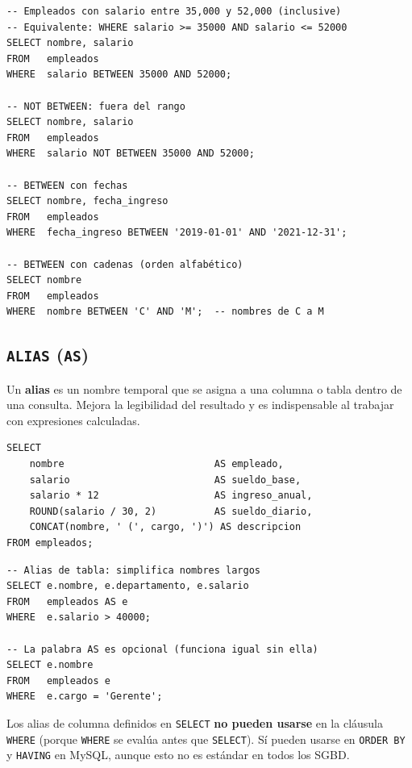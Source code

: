 \begin{lstlisting}[caption={BETWEEN con números y fechas.}]
-- Empleados con salario entre 35,000 y 52,000 (inclusive)
-- Equivalente: WHERE salario >= 35000 AND salario <= 52000
SELECT nombre, salario
FROM   empleados
WHERE  salario BETWEEN 35000 AND 52000;

-- NOT BETWEEN: fuera del rango
SELECT nombre, salario
FROM   empleados
WHERE  salario NOT BETWEEN 35000 AND 52000;

-- BETWEEN con fechas
SELECT nombre, fecha_ingreso
FROM   empleados
WHERE  fecha_ingreso BETWEEN '2019-01-01' AND '2021-12-31';

-- BETWEEN con cadenas (orden alfabético)
SELECT nombre
FROM   empleados
WHERE  nombre BETWEEN 'C' AND 'M';  -- nombres de C a M
\end{lstlisting}

\subsection{\texttt{ALIAS} (\texttt{AS})}

Un \textbf{alias} es un nombre temporal que se asigna a una columna
o tabla dentro de una consulta.
Mejora la legibilidad del resultado y es indispensable al trabajar
con expresiones calculadas.

\begin{lstlisting}[caption={Alias de columna con AS.}]
SELECT
    nombre                          AS empleado,
    salario                         AS sueldo_base,
    salario * 12                    AS ingreso_anual,
    ROUND(salario / 30, 2)          AS sueldo_diario,
    CONCAT(nombre, ' (', cargo, ')') AS descripcion
FROM empleados;
\end{lstlisting}

\begin{lstlisting}[caption={Alias de tabla: útil con JOINs y subconsultas.}]
-- Alias de tabla: simplifica nombres largos
SELECT e.nombre, e.departamento, e.salario
FROM   empleados AS e
WHERE  e.salario > 40000;

-- La palabra AS es opcional (funciona igual sin ella)
SELECT e.nombre
FROM   empleados e
WHERE  e.cargo = 'Gerente';
\end{lstlisting}

\begin{nota}
Los alias de columna definidos en \texttt{SELECT} \textbf{no pueden
usarse} en la cláusula \texttt{WHERE} (porque \texttt{WHERE} se
evalúa antes que \texttt{SELECT}).
Sí pueden usarse en \texttt{ORDER BY} y \texttt{HAVING} en MySQL,
aunque esto no es estándar en todos los SGBD.
\end{nota}

